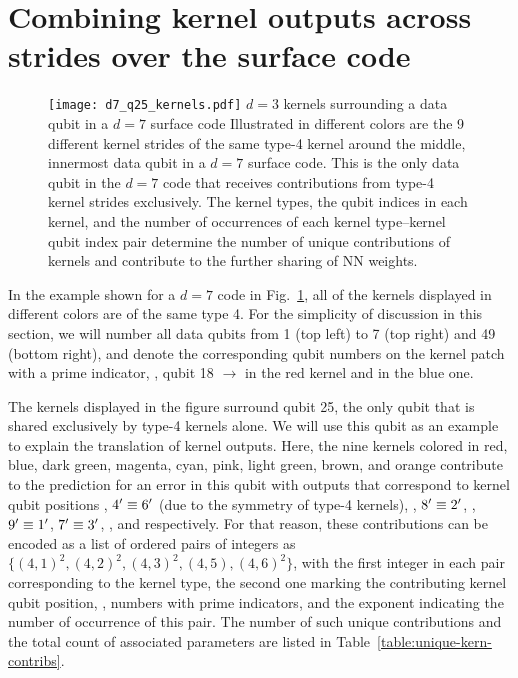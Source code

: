 \section{Combining kernel outputs across strides over the surface code}
\label{sec:kerncomb}

\begin{figure*}[htb]
\centering
\texttt{[image: d7\_q25\_kernels.pdf]}
\ccaption
{$d=3$ kernels surrounding a data qubit in a $d=7$ surface code}
{
Illustrated in different colors are the 9 different kernel strides of the same type-4 kernel around the middle, innermost data qubit in a $d=7$ surface code. This is the only data qubit in the $d=7$ code that receives contributions from type-4 kernel strides exclusively. The kernel types, the qubit indices in each kernel, and the number of occurrences of each kernel type--kernel qubit index pair determine the number of unique contributions of kernels and contribute to the further sharing of NN weights.
}
\label{fig:d7wkern}
\end{figure*}

In the example shown for a $d=7$ code in Fig.~\ref{fig:d7wkern}, all of the kernels displayed in different colors are of the same type 4. For the simplicity of discussion in this section, we will number all data qubits from 1 (top left) to 7 (top right) and 49 (bottom right), and denote the corresponding qubit numbers on the kernel patch with a prime indicator, \eg, qubit 18 $\rightarrow$  in the red kernel and  in the blue one.

The kernels displayed in the figure surround qubit 25, the only qubit that is shared exclusively by type-4 kernels alone. We will use this qubit as an example to explain the translation of kernel outputs. Here, the nine kernels colored in red, blue, dark green, magenta, cyan, pink, light green, brown, and orange contribute to the prediction for an error in this qubit with outputs that correspond to kernel qubit positions , $4^\prime\equiv6^\prime$ (due to the symmetry of type-4 kernels), , $8^\prime\equiv2^\prime$, , $9^\prime\equiv1^\prime$, $7^\prime\equiv3^\prime$, , and  respectively. For that reason, these contributions can be encoded as a list of ordered pairs of integers as $\{(4,1)^2, (4,2)^2, (4,3)^2, (4,5), (4,6)^2\}$, with the first integer in each pair corresponding to the kernel type, the second one marking the contributing kernel qubit position, \ie, numbers with prime indicators, and the exponent indicating the number of occurrence of this pair. The number of such unique contributions and the total count of associated parameters are listed in Table~\ref{table:unique-kern-contribs}.

